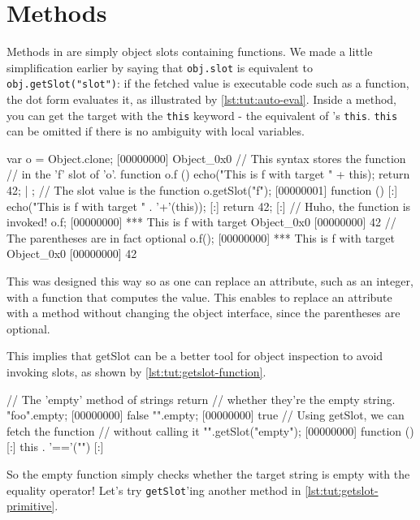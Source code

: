\section{Methods}

Methods in \us are simply object slots containing functions. We made
a little simplification earlier by saying that \lstinline|obj.slot| is
equivalent to \lstinline|obj.getSlot("slot")|: if the fetched value is
executable code such as a function, the dot form evaluates it, as
illustrated by \autoref{lst:tut:auto-eval}. Inside a method, you can get the
target with the \lstinline|this| keyword - the equivalent of \Cxx's
\lstinline{this}. \lstinline|this| can be omitted if there is no
ambiguity with local variables.

\begin{urbiscript}[caption=Function in object are automatically evaluated,
label=lst:tut:auto-eval]
var o = Object.clone;
[00000000] Object_0x0
// This syntax stores the function
// in the 'f' slot of 'o'.
function o.f ()
{
  echo("This is f with target " + this);
  return 42;
} | {};
// The slot value is the function
o.getSlot("f");
[00000001] function () {
[:]  echo("This is f with target " . '+'(this));
[:]  return 42;
[:]}
// Huho, the function is invoked!
o.f;
[00000000] *** This is f with target Object_0x0
[00000000] 42
// The parentheses are in fact optional
o.f();
[00000000] *** This is f with target Object_0x0
[00000000] 42
\end{urbiscript}

This was designed this way so as one can replace an attribute, such as
an integer, with a function that computes the value. This enables to
replace an attribute with a method without changing the object
interface, since the parentheses are optional.

This implies that getSlot can be a better tool for object inspection
to avoid invoking slots, as shown by \autoref{lst:tut:getslot-function}.

\begin{urbiscript}[caption=Inspecting executable slots with \lstinline{getSlot},
label=lst:tut:getslot-function]
// The 'empty' method of strings return
// whether they're the empty string.
"foo".empty;
[00000000] false
"".empty;
[00000000] true
// Using getSlot, we can fetch the function
// without calling it
"".getSlot("empty");
[00000000] function () {
[:]  this . '=='("")
[:]}
\end{urbiscript}

So the empty function simply checks whether the target string is empty
with the equality operator! Let's try \lstinline{getSlot}'ing another method in
\autoref{lst:tut:getslot-primitive}.

